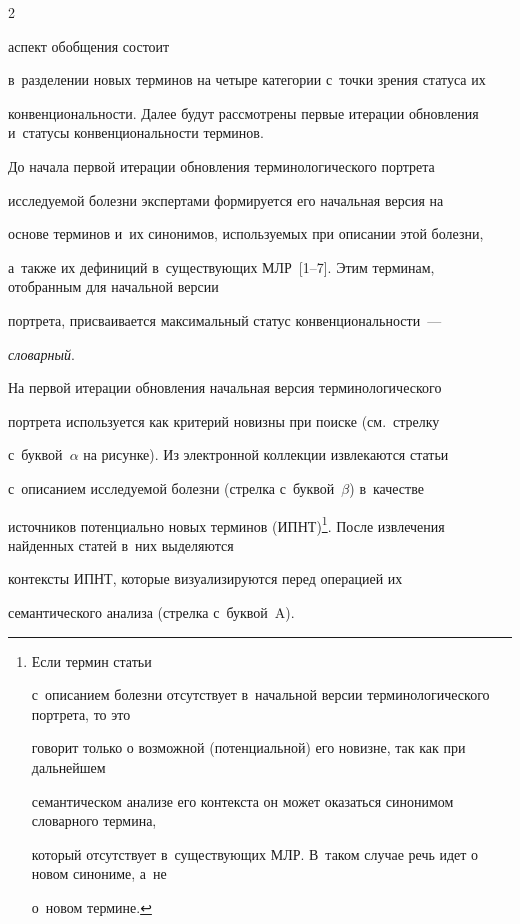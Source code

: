 \begin{multicols}{2}



\noindent

 аспект обобщения состоит 

в~разделении новых терминов на четыре категории с~точки зрения статуса их 

конвенциональности. Далее будут рассмотрены первые итерации обновления и~статусы конвенциональности терминов.



  

  До начала первой итерации обновления терминологического портрета 

исследуемой болезни экспертами формируется его начальная версия на 

основе терминов и~их синонимов, используемых при описании этой болезни, 

а~также их дефиниций в~существующих МЛР~[1--7]. Этим терминам, отобранным для начальной версии 

портрета, присваивается максимальный статус конвенциональности~--- 

\textit{словарный}.

  

  На первой итерации обновления начальная версия терминологического 

портрета используется как критерий новизны при поиске (см.\ стрелку 

с~бук\-вой~$\alpha$ на рисунке). Из электронной коллекции извлекаются статьи 

с~описанием исследуемой болезни (стрелка с~буквой~$\beta$) в~качестве 

источников потенциально новых терминов (ИПНТ)\footnote{Если термин статьи 

с~описанием болезни отсутствует в~начальной версии терминологического портрета, то это 

говорит только о возможной (потенциальной) его новизне, так как при дальнейшем 

семантическом анализе его контекста он может оказаться синонимом словарного термина, 

который отсутствует в~существующих МЛР. В~таком случае речь идет о новом синониме, а~не 

о~новом термине.}. После извлечения найденных статей в~них выделяются 

контексты ИПНТ, которые визуализируются перед операцией их 

семантического анализа (стрелка с~буквой~A).


\end{multicols}
